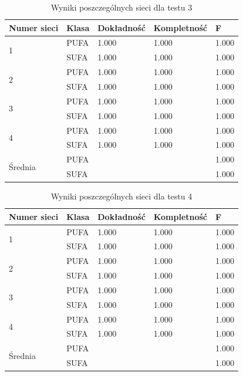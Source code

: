 \documentclass{classrep}
\begin{document}
\begin{table}
\caption{Wyniki poszczególnych sieci dla testu 3}
\label{testTab4}
\begin{tabular}{|p{1.5cm}|p{2.5cm}|p{2.5cm}|p{2.5cm}|p{2.5cm}|}
 \textbf{Numer sieci} & \textbf{Klasa} & \textbf{Dokładność} & \textbf{Kompletność} & \textbf{F} \\ \hline
\multirow{2}{*}{1} 
& PUFA & 1.000 & 1.000 & 1.000 \\
& SUFA & 1.000 & 1.000 & 1.000 \\ \hline
\multirow{2}{*}{2} 
& PUFA & 1.000 & 1.000 & 1.000 \\
& SUFA & 1.000 & 1.000 & 1.000 \\ \hline
\multirow{2}{*}{3} 
& PUFA & 1.000 & 1.000 & 1.000 \\
& SUFA & 1.000 & 1.000 & 1.000\\ \hline
\multirow{2}{*}{4} 
& PUFA & 1.000 & 1.000 & 1.000 \\
& SUFA & 1.000 & 1.000 & 1.000 \\ \hline
\multirow{2}{*}{Średnia}
& PUFA &       &       & 1.000 \\
& SUFA &       &       & 1.000 \\\hline
\end{tabular}
\end{table}

\begin{table}
\caption{Wyniki poszczególnych sieci dla testu 4}
\label{testTab5}
\begin{tabular}{|p{1.5cm}|p{2.5cm}|p{2.5cm}|p{2.5cm}|p{2.5cm}|}
 \textbf{Numer sieci} & \textbf{Klasa} & \textbf{Dokładność} & \textbf{Kompletność} & \textbf{F} \\ \hline
\multirow{2}{*}{1} 
& PUFA & 1.000 & 1.000 & 1.000 \\
& SUFA & 1.000 & 1.000 & 1.000 \\ \hline
\multirow{2}{*}{2} 
& PUFA & 1.000 & 1.000 & 1.000 \\
& SUFA & 1.000 & 1.000 & 1.000 \\ \hline
\multirow{2}{*}{3} 
& PUFA & 1.000 & 1.000 & 1.000 \\
& SUFA & 1.000 & 1.000 & 1.000\\ \hline
\multirow{2}{*}{4} 
& PUFA & 1.000 & 1.000 & 1.000 \\
& SUFA & 1.000 & 1.000 & 1.000 \\ \hline
\multirow{2}{*}{Średnia}
& PUFA &       &       & 1.000 \\
& SUFA &       &       & 1.000 \\\hline
\end{tabular}
\end{table}
\end{document}
